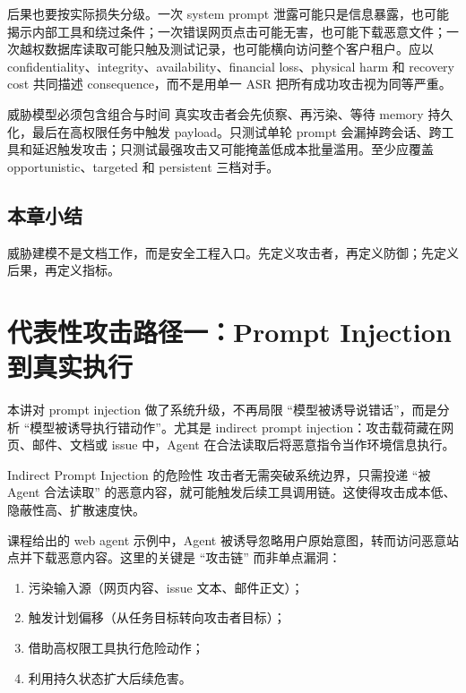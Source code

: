 \documentclass[a4paper]{article}
\begin{document}
后果也要按实际损失分级。一次 system prompt 泄露可能只是信息暴露，也可能揭示内部工具和绕过条件；一次错误网页点击可能无害，也可能下载恶意文件；一次越权数据库读取可能只触及测试记录，也可能横向访问整个客户租户。应以 confidentiality、integrity、availability、financial loss、physical harm 和 recovery cost 共同描述 consequence，而不是用单一 ASR 把所有成功攻击视为同等严重。

\begin{warningbox}{威胁模型必须包含组合与时间}
真实攻击者会先侦察、再污染、等待 memory 持久化，最后在高权限任务中触发 payload。只测试单轮 prompt 会漏掉跨会话、跨工具和延迟触发攻击；只测试最强攻击又可能掩盖低成本批量滥用。至少应覆盖 opportunistic、targeted 和 persistent 三档对手。
\end{warningbox}

\subsection{本章小结}
威胁建模不是文档工作，而是安全工程入口。先定义攻击者，再定义防御；先定义后果，再定义指标。

\section{代表性攻击路径一：Prompt Injection 到真实执行}

本讲对 prompt injection 做了系统升级，不再局限 ``模型被诱导说错话''，而是分析 ``模型被诱导执行错动作''。尤其是 indirect prompt injection：攻击载荷藏在网页、邮件、文档或 issue 中，Agent 在合法读取后将恶意指令当作环境信息执行。

\begin{importantbox}{Indirect Prompt Injection 的危险性}
攻击者无需突破系统边界，只需投递 ``被 Agent 合法读取'' 的恶意内容，就可能触发后续工具调用链。这使得攻击成本低、隐蔽性高、扩散速度快。
\end{importantbox}

课程给出的 web agent 示例中，Agent 被诱导忽略用户原始意图，转而访问恶意站点并下载恶意内容。这里的关键是 ``攻击链'' 而非单点漏洞：
\begin{enumerate}
    \item 污染输入源（网页内容、issue 文本、邮件正文）；
    \item 触发计划偏移（从任务目标转向攻击者目标）；
    \item 借助高权限工具执行危险动作；
    \item 利用持久状态扩大后续危害。
\end{enumerate}
\end{document}
